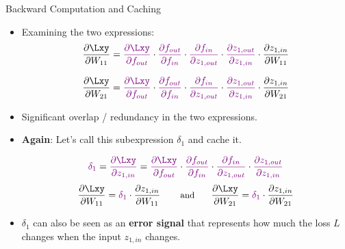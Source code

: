 \begin{frame} {Backward Computation and Caching}
\begin{itemize}
\item Examining the two expressions:
$$\frac{\partial \Lxy}{\partial W_{11}} = 
\textcolor{violet}{\frac{\partial \Lxy}{\partial f_{out}}} \cdot  \textcolor{violet}{\frac{\partial f_{out}}{\partial f_{in}}} \cdot  \textcolor{violet}{\frac{\partial f_{in}}{\partial z_{1,out}}} \cdot  \textcolor{violet}{\frac{\partial z_{1,out}}{\partial z_{1,in}}} \cdot  \textcolor{black}{\frac{\partial z_{1,in}}{\partial W_{11}}}$$

$$\frac{\partial \Lxy}{\partial W_{21}} =     
\textcolor{violet}{\frac{\partial \Lxy}{\partial f_{out}}} \cdot  \textcolor{violet}{\frac{\partial f_{out}}{\partial f_{in}}} \cdot  \textcolor{violet}{\frac{\partial f_{in}}{\partial z_{1,out}}} \cdot  \textcolor{violet}{\frac{\partial z_{1,out}}{\partial z_{1,in}}} \cdot  \textcolor{black}{\frac{\partial z_{1,in}}{\partial W_{21}}}$$

\item Significant overlap / redundancy in the two expressions.
\item \textbf{Again}: Let's call this subexpression $\delta_1$ and cache it.

{\small $$\textcolor{violet}{\delta_1}  = \textcolor{violet}{\frac{\partial \Lxy}{\partial z_{1,in}}} = 
\textcolor{violet}{\frac{\partial \Lxy}{\partial f_{out}}} \cdot  \textcolor{violet}{\frac{\partial f_{out}}{\partial f_{in}}} \cdot  \textcolor{violet}{\frac{\partial f_{in}}{\partial z_{1,out}}} \cdot  \textcolor{violet}{\frac{\partial z_{1,out}}{\partial z_{1,in}}}$$} 
{\small $$\frac{\partial \Lxy}{\partial W_{11}} = \textcolor{violet}{\delta_1} \cdot \frac{\partial z_{1,in}}{\partial W_{11}} \mbox{ \hspace{0.5cm} \small{and} \hspace{0.5cm}} \frac{\partial \Lxy}{\partial W_{21}} = \textcolor{violet}{\delta_1} \cdot \frac{\partial z_{1,in}}{\partial W_{21}} $$}
\item $\delta_1$ can also be seen as an \textbf{error signal} that represents how much the loss $L$ changes when the input $z_{1,in}$ changes.

\end{itemize}
\end{frame}
